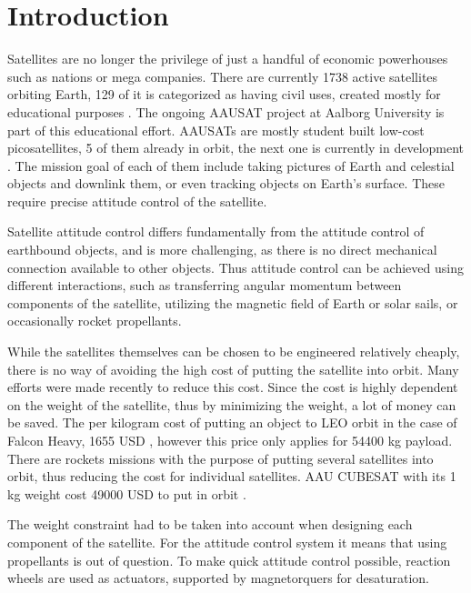 \chapter{Introduction}\label{chap:Introduction}

Satellites are no longer the privilege of just a handful of economic powerhouses such as nations or mega companies. There are currently 1738 active satellites orbiting Earth, 129 of it is categorized as having civil uses, created mostly for educational purposes \cite{SatSummary}. The ongoing AAUSAT project at Aalborg University is part of this educational effort. AAUSATs are mostly student built low-cost picosatellites, 5 of them already in orbit, the next one is currently in development \cite{aausatsite}. 
 The mission goal of each of them include taking pictures of Earth and celestial objects and downlink them, or even tracking objects on Earth's surface. These require precise attitude control of the satellite. 

Satellite attitude control differs fundamentally from the attitude control of earthbound objects, and is more challenging, as there is no direct mechanical connection available to other objects. Thus attitude control can be achieved using different interactions, such as transferring angular momentum between components of the satellite, utilizing the magnetic field of Earth or solar sails, or occasionally rocket propellants.

 While the satellites themselves can be chosen to be engineered relatively cheaply, there is no way of avoiding the high cost of putting the satellite into orbit. Many efforts were made recently to reduce this cost.  Since the cost is highly dependent on the weight of the satellite, thus by minimizing the weight, a lot of money can be saved. The per kilogram cost of putting an object to LEO orbit in the case of Falcon Heavy, 1655 USD \cite{spaceX}, however this price only applies for 54400 kg payload. There are rockets missions with the purpose of putting several satellites into orbit, thus reducing the cost for individual satellites. AAU CUBESAT with its 1 kg weight cost 49000 USD to put in orbit \cite{AAUSATpres}. 
 
 The weight constraint had to be taken into account when designing each component of the satellite. For the attitude control system it means that using propellants is out of question. To make quick attitude control possible, reaction wheels are used as actuators, supported by magnetorquers for desaturation. 
 
